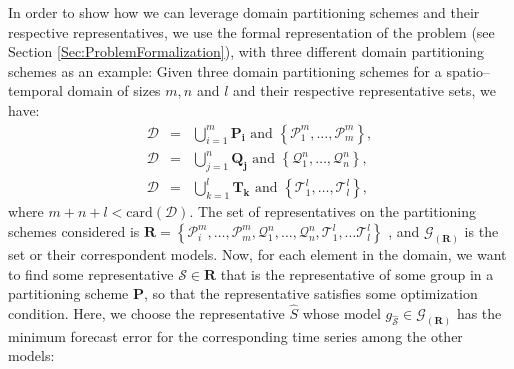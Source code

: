 In order to show how we can leverage domain partitioning schemes and their respective representatives, we use the formal representation of the problem (see Section \ref{Sec:ProblemFormalization}), with three different domain partitioning schemes as an example: Given three domain partitioning schemes for a spatio--temporal domain of sizes $m, n$ and $l$ and their respective representative sets, we have:
\begin{eqnarray} 
\nonumber
\mathcal{D}	& = & \bigcup_{i=1}^{m} \mathbf{P_i} \,\,\textrm{and} \,\, \left\{\mathcal{P}_{1}^{m}, \ldots, \mathcal{P}_{m}^{m}\right\},  \\ \nonumber
\mathcal{D} & = & \bigcup_{j=1}^{n} \mathbf{Q_j} \,\,\textrm{and} \,\, \left\{\mathcal{Q}_{1}^{n}, \ldots, \mathcal{Q}_{n}^{n}\right\}, \\ \nonumber 
\mathcal{D} & = & \bigcup_{k=1}^{l} \mathbf{T_k} \,\,\textrm{and} \,\, \left\{\mathcal{T}_{1}^{l}, \ldots, \mathcal{T}_{l}^{l}\right\},
\end{eqnarray}
where $m + n +l < \textrm{card}(\mathcal{D})$. The set of representatives on the partitioning schemes considered is $\mathbf{R} = \left\{\mathcal{P}_{i}^{m}, \ldots, \mathcal{P}_{m}^{m}, \mathcal{Q}_{1}^{n}, \ldots, \mathcal{Q}_{n}^{n}, \mathcal{T}_{1}^{l}, \ldots \mathcal{T}_{l}^{l} \right\}$ , and $\mathcal{G}_{(\mathbf{R})}$ is the set or their correspondent models. Now, for each element in the domain, we want to find some representative $\mathcal{S} \in \mathbf{R}$ that is the representative of some group in a partitioning scheme $\mathbf{P}$, so that the representative satisfies some optimization condition. Here, we choose the representative $\hat{S}$ whose model $g_{\mathcal{\hat{S}}} \in \mathcal{G}_{(\mathbf{R})}$ has the minimum forecast error for the corresponding time series among the other models:

